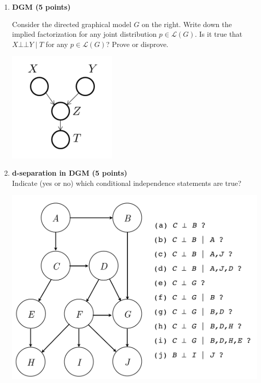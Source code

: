 \documentclass[12pt]{article}
\newcommand{\1}{{\bf 1}}
\newcommand{\indep}{\bot\!\!\!\bot}
\begin{document}
\begin{enumerate}

\item {\bf DGM (5 points)}  \\
\begin{minipage}[b]{0.7\textwidth}
Consider the directed graphical model $G$ on the right. 
Write down the implied factorization for any joint distribution $p \in \mathcal{L}(G)$.
Is it true that $X \indep Y \mid T$ for any $p \in \mathcal{L}(G)$? Prove or disprove.
\end{minipage}
\begin{minipage}{0.3\textwidth}
\vspace{-10mm}
\hspace{0.6cm}\includegraphics[scale=.5]{hwk3_GMex.png} \vspace{-10mm}
\end{minipage}

\item {\bf d-separation in DGM (5 points)} \\
Indicate (yes or no) which conditional independence statements are true?

\hspace{0cm} \includegraphics[scale=0.33]{hwk3_d-sep.pdf}


\end{enumerate}
\end{document}
